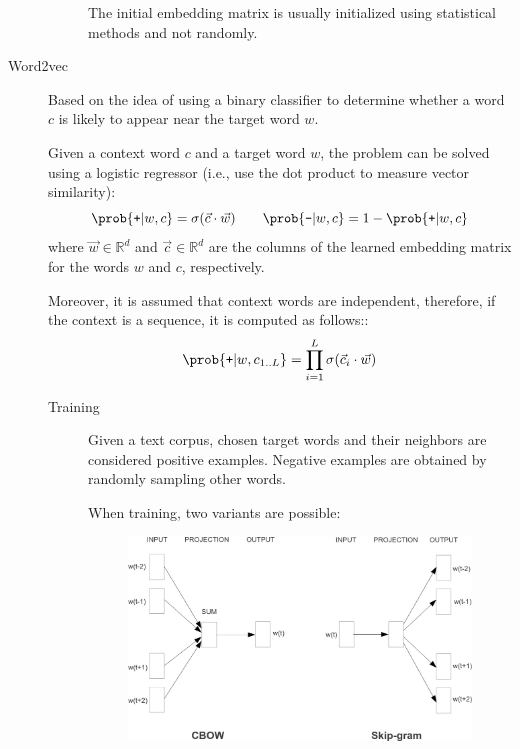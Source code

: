 \begin{description}
\begin{description}
                \begin{remark}
                    The initial embedding matrix is usually initialized using statistical methods and not randomly.
                \end{remark}
        \end{description}

    \item[Word2vec] 
        Based on the idea of using a binary classifier to determine whether a word $c$ is likely to appear near the target word $w$. 

        Given a context word $c$ and a target word $w$, the problem can be solved using a logistic regressor (i.e., use the dot product to measure vector similarity):
        \[ 
            \prob{\texttt{+} | w, c} = \sigma(\vec{c} \cdot \vec{w}) 
            \qquad
            \prob{\texttt{-} | w, c} = 1 - \prob{\texttt{+} | w, c}
        \]
        where $\vec{w} \in \mathbb{R}^{d}$ and $\vec{c} \in \mathbb{R}^{d}$ are the columns of the learned embedding matrix for the words $w$ and $c$, respectively.

        Moreover, it is assumed that context words are independent, therefore, if the context is a sequence, it is computed as follows::
        \[ \prob{\texttt{+} | w, c_{1..L}} = \prod_{i=1}^{L} \sigma(\vec{c}_i \cdot \vec{w}) \]

        \begin{description}
            \item[Training]
                Given a text corpus, chosen target words and their neighbors are considered positive examples. Negative examples are obtained by randomly sampling other words.

                When training, two variants are possible:
                \begin{figure}[H]
                    \centering
                    \includegraphics[width=0.65\linewidth]{./img/word2vec_alternatives.png}
                \end{figure}
        \end{description}


\end{description}
